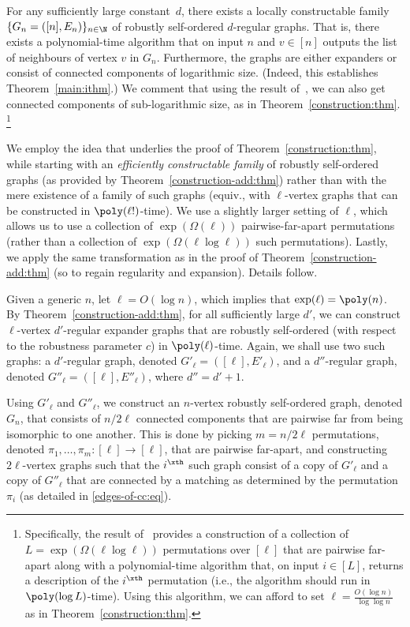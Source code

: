 %
\label{strong-construction:thm}
For any sufficiently large constant~$d$, there exists
a locally constructable family $\{G_n=([n],E_n)\}_{n\in\N}$
of robustly self-ordered $d$-regular graphs.
That is, there exists a polynomial-time algorithm
that on input $n$ and $v\in[n]$ outputs the list of neighbours
of vertex $v$ in $G_n$.
Furthermore, the graphs are either expanders
or consist of connected components of logarithmic size.
%
\ET
(Indeed, this establishes Theorem~\ref{main:ithm}.)
We comment that using the result of~\cite{GW:perm},
we can also get connected components of sub-logarithmic size,
as in Theorem~\ref{construction:thm}.
\footnote{Specifically, the result of~\cite{GW:perm} provides
a construction of a collection of $L=\exp(\Omega(\ell\log\ell))$
permutations over $[\ell]$ that are pairwise far-apart
along with a polynomial-time algorithm that, on input $i\in[L]$,
returns a description of the $i^\xth$ permutation
(i.e., the algorithm should run in $\poly(\log L)$-time).
Using this algorithm,
we can afford to set $\ell=\frac{O(\log n)}{\log\log n}$
as in Theorem~\ref{construction:thm}.}
\medskip

\BPF
We employ the idea that underlies the proof of
Theorem~\ref{construction:thm},
while starting with an {\em efficiently constructable family}\/
of robustly self-ordered graphs
(as provided by Theorem~\ref{construction-add:thm})
rather than with the mere existence of a family of such graphs
(equiv., with $\ell$-vertex graphs that can be constructed
in $\poly(\ell!)$-time).
We use a slightly larger setting of $\ell$,
which allows us to use a collection of $\exp(\Omega(\ell))$
pairwise-far-apart permutations (rather than a collection
of $\exp(\Omega(\ell\log\ell))$ such permutations).
Lastly, we apply the same transformation as in the
proof of Theorem~\ref{construction-add:thm}
(so to regain regularity and expansion).
Details follow.

Given a generic $n$, let $\ell=O(\log n)$,
which implies that $\exp(\ell)=\poly(n)$.
By Theorem~\ref{construction-add:thm},
for all sufficiently large $d'$,
we can construct $\ell$-vertex $d'$-regular expander graphs that
are robustly self-ordered (with respect to the robustness parameter $c$)
in $\poly(\ell)$-time.
Again, we shall use two such graphs:
a $d'$-regular graph, denoted $G'_\ell=([\ell],E'_\ell)$,
and a $d''$-regular graph, denoted $G''_\ell=([\ell],E''_\ell)$,
where $d''=d'+1$.

Using $G'_\ell$ and $G''_\ell$, we construct an $n$-vertex
robustly self-ordered graph, denoted $G_n$,
that consists of $n/2\ell$ connected components that
are pairwise far from being isomorphic to one another.
This is done by picking $m=n/2\ell$ permutations,
denoted $\pi_1,\ldots,\pi_m:[\ell]\to[\ell]$,
that are pairwise far-apart, and constructing $2\ell$-vertex graphs
%
%
%
such that the $i^\xth$ such graph consist of
a copy of $G'_\ell$ and a copy of $G''_\ell$ that are connected
by a matching as determined by the permutation $\pi_i$
(as detailed in \eqref{edges-of-cc:eq}).
%

